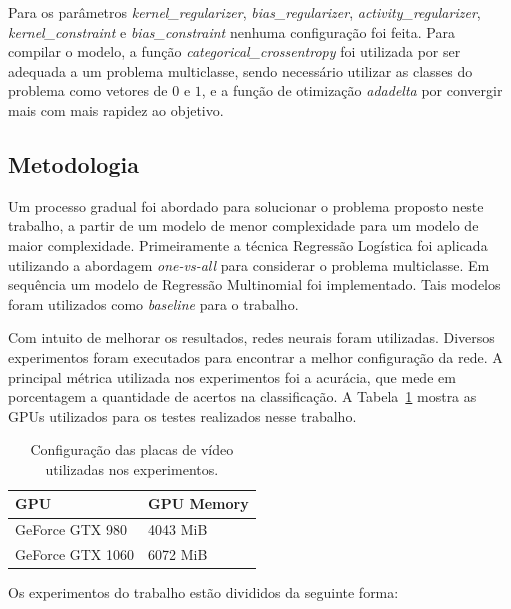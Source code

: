 \documentclass[conference]{IEEEtran}
\begin{document}
Para os parâmetros \textit{kernel\_regularizer}, \textit{bias\_regularizer}, \textit{activity\_regularizer}, \textit{kernel\_constraint} e \textit{bias\_constraint} nenhuma configuração foi feita. Para compilar o modelo, a função \emph{categorical\_crossentropy} foi utilizada por ser adequada a um problema multiclasse, sendo necessário utilizar as classes do problema como vetores de $0$ e $1$, e a função de otimização \emph{adadelta} por convergir mais com mais rapidez ao objetivo.

\subsection{Metodologia} \label{sec:met}

Um processo gradual foi abordado para solucionar o problema proposto neste trabalho, a partir de um modelo de menor complexidade para um modelo de maior complexidade. Primeiramente a técnica Regressão Logística foi aplicada utilizando a abordagem \emph{one-vs-all} para considerar o problema multiclasse. Em sequência um modelo de Regressão Multinomial foi implementado. Tais modelos foram utilizados como \emph{baseline} para o trabalho.

Com intuito de melhorar os resultados, redes neurais foram utilizadas. Diversos experimentos foram executados para encontrar a melhor configuração da rede. A principal métrica utilizada nos experimentos foi a acurácia, que mede em porcentagem a quantidade de acertos na classificação. A Tabela~\ref{tab:config} mostra as GPUs utilizados para os testes realizados nesse trabalho.


\begin{table}[h!]
	\centering
	\begin{tabular}{ll} \toprule
		  \textbf{GPU} & \textbf{GPU Memory} \\ \toprule 	
		  GeForce GTX 980 & 4043 MiB \\ 
		  GeForce GTX 1060 & 6072 MiB \\ 
		 \bottomrule
	\end{tabular}
	\caption{\small Configuração das placas de vídeo utilizadas nos experimentos.}
	\label{tab:config}
\end{table}

Os experimentos do trabalho estão divididos da seguinte forma: 
\end{document}
